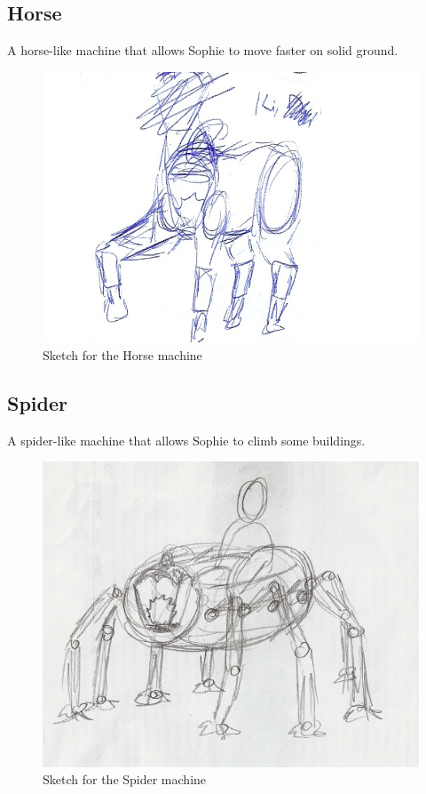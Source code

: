 \subsection*{Horse}
A horse-like machine that allows Sophie to move faster on solid ground.
\begin{figure}[H]
  \centering
  \includegraphics[width=14cm]{Images/Machines/machineHorse}
  \caption{Sketch for the Horse machine}
\end{figure}

\subsection*{Spider}
A spider-like machine that allows Sophie to climb some buildings.
\begin{figure}[H]
  \centering
  \includegraphics[width=14cm]{Images/Machines/machineSpider}
  \caption{Sketch for the Spider machine}
\end{figure}

